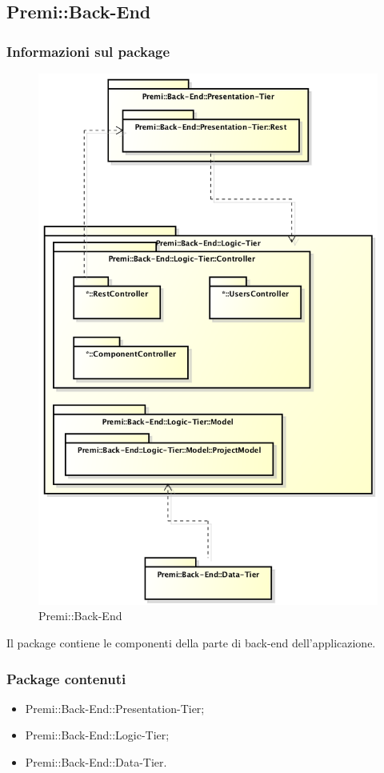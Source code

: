 \subsection{Premi::\gls{Back-End}}
	\subsubsection*{Informazioni sul package}
		\begin{figure}[h]
			\centering
			\includegraphics[width=0.7\linewidth]{img/back-end_package}
			\caption[Premi::Back-End]{Premi::Back-End}
		\end{figure}
		Il package contiene le componenti della parte di \gls{back-end} dell'applicazione.
		
	\subsubsection*{Package contenuti}
		\begin{itemize}
			\item Premi::\gls{Back-End}::Presentation-Tier;
			\item Premi::\gls{Back-End}::Logic-Tier;
			\item Premi::\gls{Back-End}::Data-Tier.
		\end{itemize}

